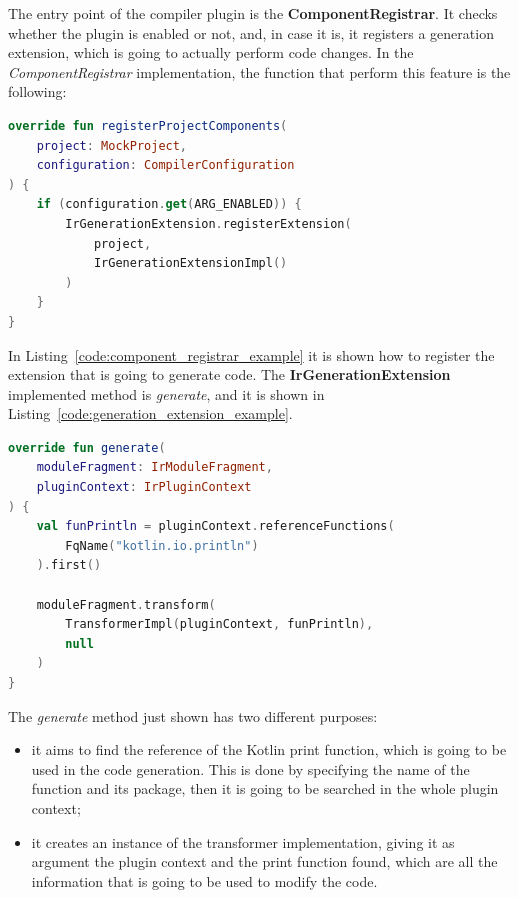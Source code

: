 The entry point of the compiler plugin is the \textbf{ComponentRegistrar}. It checks whether the plugin is enabled or not, and, in case it is, it registers a generation extension, which is going to actually perform code changes. In the \textit{ComponentRegistrar} implementation, the function that perform this feature is the following:
\begin{lstlisting}[caption={Example of registration of extension if the plugin is enabled performed by the \textit{ComponentRegistrar}}, captionpos=b, language=Kotlin, label={code:component_registrar_example}]
override fun registerProjectComponents(
    project: MockProject,
    configuration: CompilerConfiguration
) {
    if (configuration.get(ARG_ENABLED)) {
        IrGenerationExtension.registerExtension(
            project,
            IrGenerationExtensionImpl()
        )
    }
}
\end{lstlisting}
In Listing~\ref{code:component_registrar_example} it is shown how to register the extension that is going to generate code. The \textbf{IrGenerationExtension} implemented method is \textit{generate}, and it is shown in Listing~\ref{code:generation_extension_example}.
\begin{lstlisting}[caption={Example of \textit{IrGenerationExtension} implementation of methos generate}, captionpos=b, language=Kotlin, label={code:generation_extension_example}]
override fun generate(
    moduleFragment: IrModuleFragment,
    pluginContext: IrPluginContext
) {
    val funPrintln = pluginContext.referenceFunctions(
        FqName("kotlin.io.println")
    ).first()

    moduleFragment.transform(
        TransformerImpl(pluginContext, funPrintln),
        null
    )
}
\end{lstlisting}
The \textit{generate} method just shown has two different purposes:
\begin{itemize}
    \item it aims to find the reference of the Kotlin print function, which is going to be used in the code generation. This is done by specifying the name of the function and its package, then it is going to be searched in the whole plugin context;
    \item it creates an instance of the transformer implementation, giving it as argument the plugin context and the print function found, which are all the information that is going to be used to modify the code.
\end{itemize}

